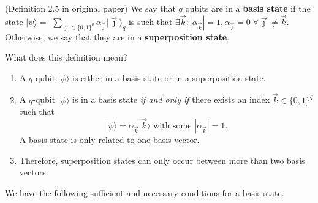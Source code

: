 \begin{definition} (Definition 2.5 in original paper) 
We say that $q$ qubits are in a \textbf{basis state} if the state $|\psi\rangle=$ $\sum_{\vec{\jmath} \in\{0,1\}^q} \alpha_{\vec{\jmath}}|\vec{\jmath}\rangle_q$ is such that $\exists \vec{k}:\left|\alpha_{\vec{k}}\right|=1, \alpha_{\vec{\jmath}}=0 \; \forall \vec{\jmath} \neq \vec{k}$. Otherwise, we say that they are in a \textbf{superposition state}.
\end{definition}
What does this definition mean?
\begin{enumerate}
    \item A $q$-qubit $|\psi\rangle$ is either in a basis state or in a superposition state.
    \item A $q$-qubit $|\psi\rangle$ is in a {basis state} \textit{if and only if} there exists an index $\vec{k} \in
    \{0,1\}^q$ such that 
    \begin{equation}
    |\psi\rangle=\alpha_{\vec{k}}|\vec{k}\rangle \text { with some }\left|\alpha_{\vec{k}}\right|=1.
\end{equation}
    A basis state is only related to one basis vector.
    \item Therefore, superposition states can only occur between more than two basis vectors.
\end{enumerate}

We have the following sufficient and necessary conditions for a basis state.

